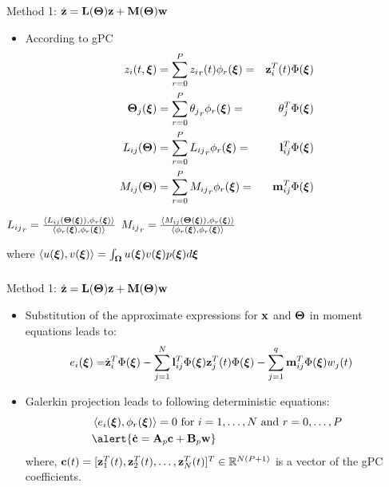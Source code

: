 \documentclass{beamer}
\begin{document}
\begin{frame}\frametitle{\color{black}{Proposed Approach}}\framesubtitle{\color{white}{$\dot{\x} = \A(\Th)\x + \B(\Th)\u+ \G(\Th)\et$}}
\vspace{-0.1in}
\begin{block}{Method 1: $\dot{\mathbf{z}}= \mathbf{L}(\boldsymbol{\Theta})\mathbf{z}+\mathbf{M}(\boldsymbol{\Theta})\mathbf{w} $}
\begin{itemize}
\item According to gPC
\small{\begin{eqnarray}
z_{i}(t,\boldsymbol{\xi}) &= \sum\limits_{r=0}^P {z_i}_r(t)\phi_r(\boldsymbol{\xi}) =& \mathbf{z}_i^T(t)\Phi(\boldsymbol{\xi}) \label{states}\\
\boldsymbol{\Theta}_j(\boldsymbol{\xi}) &= \sum\limits_{r=0}^P {\theta_j}_r\phi_r(\boldsymbol{\xi}) =& \theta_j^T\Phi(\boldsymbol{\xi}) \label{params}\\
L_{ij}(\boldsymbol{\Theta}) &= \sum\limits_{r=0}^P {L_{ij}}_r\phi_r(\boldsymbol{\xi}) =& \mathbf{l}_{ij}^T\Phi(\boldsymbol{\xi}) \label{paramsA}\\
M_{ij}(\boldsymbol{\Theta}) &= \sum\limits_{r=0}^P {M_{ij}}_r\phi_r(\boldsymbol{\xi}) =& \mathbf{m}_{ij}^T\Phi(\boldsymbol{\xi}) \label{paramsB}
\end{eqnarray}}
\end{itemize}
\end{block}
\small{${L_{ij}}_r = \frac{\left\langle L_{ij}(\boldsymbol{\Theta}(\boldsymbol{\xi})),\phi_r(\boldsymbol{\xi})\right\rangle}{\left\langle \phi_r(\boldsymbol{\xi}),\phi_r(\boldsymbol{\xi})\right\rangle}$
${M_{ij}}_r = \frac{\left\langle M_{ij}(\boldsymbol{\Theta}(\boldsymbol{\xi})),\phi_r(\boldsymbol{\xi})\right\rangle}{\left\langle \phi_r(\boldsymbol{\xi}),\phi_r(\boldsymbol{\xi})\right\rangle}$\\\vspace{0.2in}


\alert{where $\left\langle u(\boldsymbol{\xi}),v(\boldsymbol{\xi})\right\rangle = \int_{\boldsymbol{\Omega}}{u(\boldsymbol{\xi})v(\boldsymbol{\xi})p(\boldsymbol{\xi})d\boldsymbol{\xi}}$}}
\end{frame}

\begin{frame}\frametitle{\color{black}{Proposed Approach}}\framesubtitle{\color{white}{$\dot{\x} = \A(\Th)\x + \B(\Th)\u+ \G(\Th)\et$}}

\begin{block}{Method 1: $\dot{\mathbf{z}}= \mathbf{L}(\boldsymbol{\Theta})\mathbf{z}+\mathbf{M}(\boldsymbol{\Theta})\mathbf{w} $}
\begin{itemize}
\item Substitution of the approximate expressions for $\mathbf{x}$ and $\boldsymbol{\Theta}$ in moment equations leads to:
\begin{align}\notag
e_i(\boldsymbol{\xi}) = &\dot{\mathbf{z}}_i^T\Phi(\boldsymbol{\xi})-\sum_{j=1}^N{\mathbf{l}_{ij}^T\Phi(\boldsymbol{\xi})\mathbf{z}_j^T(t)\Phi(\boldsymbol{\xi})}-\sum_{j=1}^q{\mathbf{m}_{ij}^T\Phi(\boldsymbol{\xi})w_j(t)}
\end{align}
\item Galerkin projection leads to following deterministic equations:
\begin{align}
&\left\langle e_i(\xib),\phi_r(\xib)\right\rangle = 0 \mbox{ for $i = 1,\ldots,N$ and $r = 0,\ldots,P$} \notag\\
&\alert{\dot{\v{c}} = \A_p\v{c}+\B_p\w}
\end{align}
where, $\mathbf{c}(t) = [\mathbf{z}_1^T(t),\mathbf{z}_2^T(t),\ldots,\mathbf{z}_N^T(t)]^T \in \mathbb R^{N(P+1)}$ is a vector of the gPC coefficients.
\end{itemize}
\end{block}
\end{frame}
\end{document}
